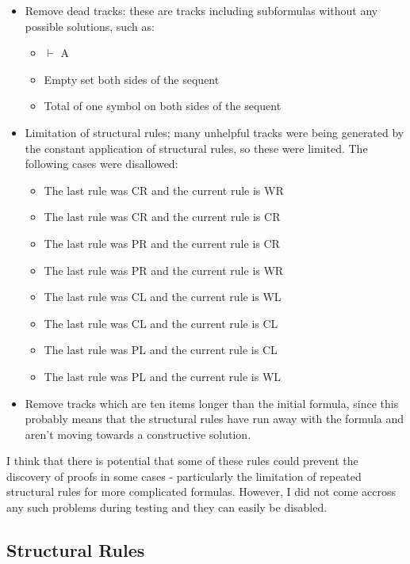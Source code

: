 \documentclass{article}
\begin{document}
\begin{itemize}
  \item Remove dead tracks: these are tracks including subformulas without any
  possible solutions, such as:
  \begin{itemize}
    \item $\vdash$ A
    \item Empty set both sides of the sequent
    \item Total of one symbol on both sides of the sequent
  \end{itemize}

  \item Limitation of structural rules; many unhelpful tracks were being generated by
  the constant application of structural rules, so these were limited. The
  following cases were disallowed:
  \begin{itemize}
    \item The last rule was CR and the current rule is WR
    \item The last rule was CR and the current rule is CR
    \item The last rule was PR and the current rule is CR
    \item The last rule was PR and the current rule is WR
    \item The last rule was CL and the current rule is WL
    \item The last rule was CL and the current rule is CL
    \item The last rule was PL and the current rule is CL
    \item The last rule was PL and the current rule is WL
  \end{itemize}

  \item Remove tracks which are ten items longer than the initial formula, since
  this probably means that the structural rules have run away with the formula
  and aren't moving towards a constructive solution.
\end{itemize}

I think that there is potential that some of these rules could prevent the
discovery of proofs in some cases - particularly the limitation of repeated
structural rules for more complicated formulas. However, I did not
come accross any such problems during testing and they can easily be disabled.

\subsection{Structural Rules}
\end{document}
